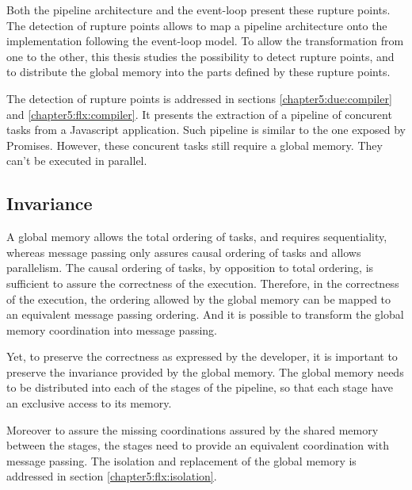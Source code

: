 Both the pipeline architecture and the event-loop present these rupture points.
The detection of rupture points allows to map a pipeline architecture onto the implementation following the event-loop model.
To allow the transformation from one to the other, this thesis studies the possibility to detect rupture points, and to distribute the global memory into the parts defined by these rupture points.

The detection of rupture points is addressed in sections \ref{chapter5:due:compiler} and \ref{chapter5:flx:compiler}.
It presents the extraction of a pipeline of concurent tasks from a Javascript application.
Such pipeline is similar to the one exposed by Promises.
However, these concurent tasks still require a global memory.
They can't be executed in parallel.

\subsection{Invariance}


A global memory allows the total ordering of tasks, and requires sequentiality, whereas message passing only assures causal ordering of tasks and allows parallelism.
The causal ordering of tasks, by opposition to total ordering, is sufficient to assure the correctness of the execution.
Therefore, in the correctness of the execution, the ordering allowed by the global memory can be mapped to an equivalent message passing ordering.
And it is possible to transform the global memory coordination into message passing.

Yet, to preserve the correctness as expressed by the developer, it is important to preserve the invariance provided by the global memory.
The global memory needs to be distributed into each of the stages of the pipeline, so that each stage have an exclusive access to its memory.

Moreover to assure the missing coordinations assured by the shared memory between the stages, the stages need to provide an equivalent coordination with message passing.
The isolation and replacement of the global memory is addressed in section \ref{chapter5:flx:isolation}.




